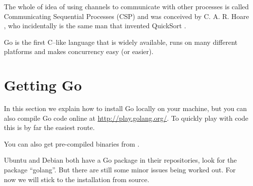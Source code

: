 The whole of idea of using channels to communicate with other processes
is called Communicating Sequential Processes (CSP) and was conceived
by C. A. R. Hoare \cite{hoare}, who incidentally is the same man that
invented QuickSort \cite{quicksort}.

\begin{lbar}[]
Go is the first C--like language that is widely available,
runs on many
different platforms and makes concurrency easy (or easier).
\end{lbar}

\section{Getting Go}
In this section we explain how to install Go locally on your machine, but you can
also compile Go code online at \url{http://play.golang.org/}. To quickly
play with code this is by far the easiest route.

You can also get pre-compiled binaries from \cite{go_install}.

Ubuntu and Debian both have a Go package in their repositories, look for
the package ``golang''. But there are still some minor issues being worked
out. For now we will stick to the installation from source.

